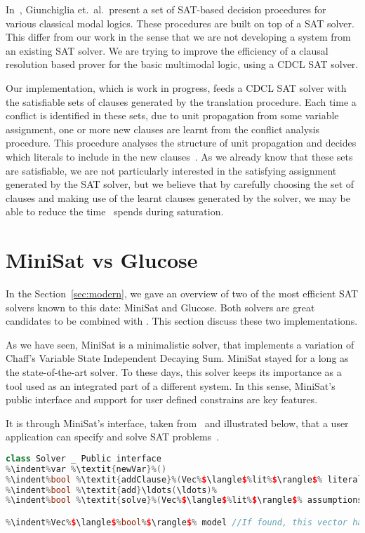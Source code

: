 In~\cite{giunchiglia2002sat}, Giunchiglia et.\ al.\ present a set of SAT-based
decision procedures for various classical modal logics. These procedures are
built on top of a SAT solver. This differ from our work in the sense that we are
not developing a system from an existing SAT solver. We are trying to improve the
efficiency of a clausal resolution based prover for the basic multimodal logic,
using a CDCL SAT solver.

Our implementation, which is work in progress, feeds a CDCL SAT solver with the
satisfiable sets of clauses generated by the translation procedure. Each time a
conflict is identified in these sets, due to unit propagation from some variable
assignment, one or more new clauses are learnt from the conflict analysis
procedure. This procedure analyses the structure of unit propagation and decides
which literals to include in the new clauses~\cite{cdclchapter}. As we already
know that these sets are satisfiable, we are not particularly interested in the
satisfying assignment generated by the SAT solver, but we believe that by
carefully choosing the set of clauses and making use of the learnt clauses
generated by the solver, we may be able to reduce the time \ksp~spends during
saturation. 


\section{MiniSat vs Glucose}
In the Section~\ref{sec:modern}, we gave an overview of two of the most
efficient SAT solvers known to this date: MiniSat and Glucose. Both solvers are great candidates to be combined with \ksp. This section discuss these two
implementations. 

As we have seen, MiniSat is a minimalistic solver, that implements a variation
of Chaff's Variable State Independent Decaying Sum. MiniSat stayed for a long as
the state-of-the-art solver. To these days, this solver keeps its
importance as a tool used as an integrated part of a different system. In this
sense, MiniSat's public interface and support for user defined constrains are
key features.

It is through MiniSat's interface, taken from~\cite{een2003extensible} and
illustrated below, that a user application can specify and solve SAT
problems~\cite{een2003extensible}. 

\begin{lstlisting}[frame=single, language=C++,morekeywords={var,Solver,Vec,lit},escapechar=\%,
commentstyle=\color{gray}]
class Solver _ Public interface
%\indent%var %\textit{newVar}%()
%\indent%bool %\textit{addClause}%(Vec%$\langle$%lit%$\rangle$% literals)
%\indent%bool %\textit{add}\ldots(\ldots)%
%\indent%bool %\textit{solve}%(Vec%$\langle$%lit%$\rangle$% assumptions)

%\indent%Vec%$\langle$%bool%$\rangle$% model //If found, this vector has the model
\end{lstlisting}

